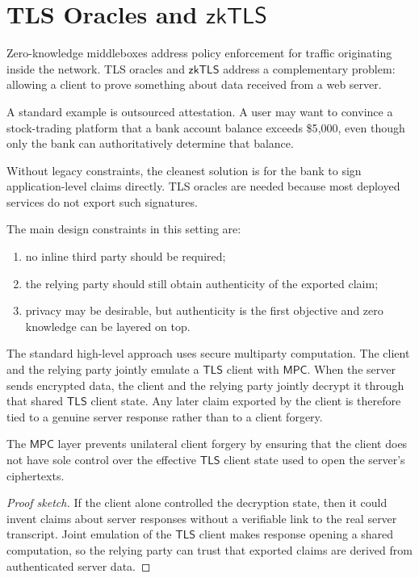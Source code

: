 \documentclass[11pt]{article}
\newcommand{\TLS}{\ensuremath{\mathsf{TLS}}}
\newcommand{\MPC}{\ensuremath{\mathsf{MPC}}}
\newcommand{\ZKTLS}{\ensuremath{\mathsf{zkTLS}}}
\begin{document}
\section{TLS Oracles and \texorpdfstring{\ZKTLS}{zkTLS}}

Zero-knowledge middleboxes address policy enforcement for traffic originating
inside the network.  TLS oracles and \ZKTLS{} address a complementary problem:
allowing a client to prove something about data received from a web server.

A standard example is outsourced attestation.  A user may want to convince a
stock-trading platform that a bank account balance exceeds \$5{,}000, even
though only the bank can authoritatively determine that balance.

Without legacy constraints, the cleanest solution is for the bank to sign
application-level claims directly.  TLS oracles are needed because most
deployed services do not export such signatures.

The main design constraints in this setting are:
\begin{enumerate}
  \item no inline third party should be required;
  \item the relying party should still obtain authenticity of the exported
        claim;
  \item privacy may be desirable, but authenticity is the first objective and
        zero knowledge can be layered on top.
\end{enumerate}

The standard high-level approach uses secure multiparty computation.  The
client and the relying party jointly emulate a \TLS{} client with \MPC.  When
the server sends encrypted data, the client and the relying party jointly
decrypt it through that shared \TLS{} client state.  Any later claim exported
by the client is therefore tied to a genuine server response rather than to a
client forgery.

\begin{proposition}
The \MPC{} layer prevents unilateral client forgery by ensuring that the client
does not have sole control over the effective \TLS{} client state used to open
the server's ciphertexts.
\end{proposition}

\begin{proof}[Proof sketch]
If the client alone controlled the decryption state, then it could invent
claims about server responses without a verifiable link to the real server
transcript.  Joint emulation of the \TLS{} client makes response opening a
shared computation, so the relying party can trust that exported claims are
derived from authenticated server data.
\end{proof}
\end{document}
